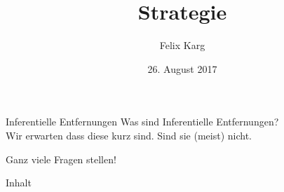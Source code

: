 \documentclass[12pt,compress,ngerman,utf8,t]{beamer}
\date{26. August 2017}
\institute{Student of Rationality}
\title{Strategie}
\author{Felix Karg}
\begin{document}
\begin{frame}[c]{Inferentielle Entfernungen}
    \large
    Was sind Inferentielle Entfernungen? \\ \pause
    Wir erwarten dass diese kurz sind. Sind sie (meist) nicht.
\end{frame}


\begin{frame}[standout]
    Ganz viele Fragen stellen!
\end{frame}


\maketitle



\begin{frame}{Inhalt}
    \small
    \begin{multicols}{2}
        \small
        \tableofcontents[hidesubsections]
    \end{multicols}
    \clearpage
\end{frame}







\end{document}
